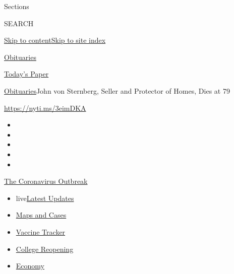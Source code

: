 Sections

SEARCH

\protect\hyperlink{site-content}{Skip to
content}\protect\hyperlink{site-index}{Skip to site index}

\href{https://www.nytimes.com/section/obituaries}{Obituaries}

\href{https://myaccount.nytimes.com/auth/login?response_type=cookie\&client_id=vi}{}

\href{https://www.nytimes.com/section/todayspaper}{Today's Paper}

\href{/section/obituaries}{Obituaries}\textbar{}John von Sternberg,
Seller and Protector of Homes, Dies at 79

\url{https://nyti.ms/3eimDKA}

\begin{itemize}
\item
\item
\item
\item
\item
\end{itemize}

\href{https://www.nytimes.com/news-event/coronavirus?action=click\&pgtype=Article\&state=default\&region=TOP_BANNER\&context=storylines_menu}{The
Coronavirus Outbreak}

\begin{itemize}
\tightlist
\item
  live\href{https://www.nytimes.com/2020/08/03/world/coronavirus-covid-19.html?action=click\&pgtype=Article\&state=default\&region=TOP_BANNER\&context=storylines_menu}{Latest
  Updates}
\item
  \href{https://www.nytimes.com/interactive/2020/us/coronavirus-us-cases.html?action=click\&pgtype=Article\&state=default\&region=TOP_BANNER\&context=storylines_menu}{Maps
  and Cases}
\item
  \href{https://www.nytimes.com/interactive/2020/science/coronavirus-vaccine-tracker.html?action=click\&pgtype=Article\&state=default\&region=TOP_BANNER\&context=storylines_menu}{Vaccine
  Tracker}
\item
  \href{https://www.nytimes.com/2020/08/02/us/covid-college-reopening.html?action=click\&pgtype=Article\&state=default\&region=TOP_BANNER\&context=storylines_menu}{College
  Reopening}
\item
  \href{https://www.nytimes.com/live/2020/08/03/business/stock-market-today-coronavirus?action=click\&pgtype=Article\&state=default\&region=TOP_BANNER\&context=storylines_menu}{Economy}
\end{itemize}

